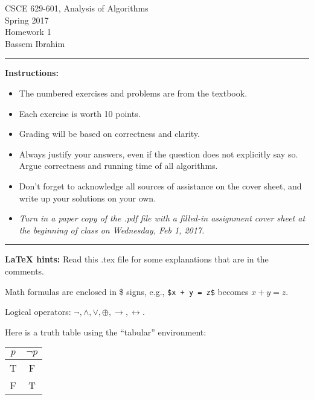 \documentclass[12pt]{article}  %
\newcommand{\NOT}{\neg}
\newcommand{\AND}{\wedge}
\newcommand{\OR}{\vee}
\newcommand{\XOR}{\oplus}
\newcommand{\IMPLIES}{\rightarrow}
\newcommand{\IFF}{\leftrightarrow}
\begin{document}
\begin{center}         %
{\large                %
CSCE 629-601, Analysis of Algorithms \\  %
Spring 2017 \\
Homework 1 \\
Bassem Ibrahim}
\end{center}


\rule{6in}{.1pt}       %
                    
\noindent              %
{\bf Instructions:}    %

\begin{itemize}        %
\item The numbered exercises and problems are from the textbook.  
\item Each exercise is worth 10 points.
\item Grading will be based on correctness and clarity.
\item Always justify your answers, even if the question does not
      explicitly say so.  Argue correctness and running time of all algorithms.
\item Don't forget to acknowledge all sources of assistance on the cover
      sheet, and write up your solutions on your own.
\item {\em Turn in a paper copy of the .pdf file with a
      filled-in assignment cover sheet at the beginning of class on 
      Wednesday, Feb 1, 2017.}
\end{itemize}

\rule{6in}{.1pt}       %

\noindent
{\bf LaTeX hints:}  Read this .tex file for some explanations that are in
the comments.

Math formulas are enclosed in \$ signs, e.g., {\tt \$x + y = z\$}
becomes $x + y = z$.

Logical operators: $\NOT, \AND, \OR, \XOR, \IMPLIES, \IFF$.

Here is a truth table using the ``tabular'' environment:

\begin{center}
\begin{tabular}{|c|c|}  %
\hline                  %
$p$ & $\NOT p$ \\       %
\hline
\hline
T & F \\
\hline
F & T \\
\hline
\end{tabular}
\end{center}
\end{document}
